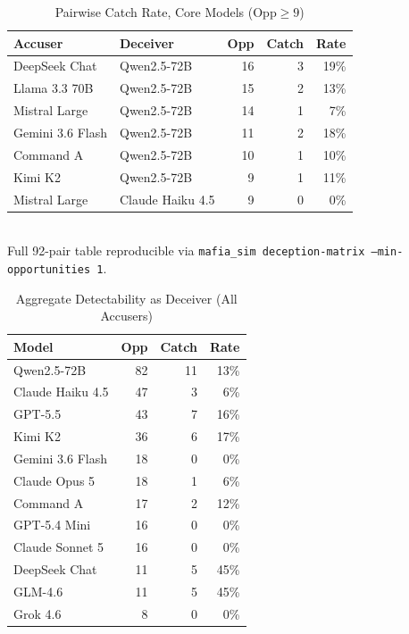 \documentclass[10pt,conference]{IEEEtran}
\begin{document}
\begin{table}[t]
\centering
\caption{Pairwise Catch Rate, Core Models ($\mathrm{Opp} \geq 9$)}
\label{tab:pairwise}
\begin{tabular}{@{}llrrr@{}}
\toprule
Accuser & Deceiver & Opp & Catch & Rate \\
\midrule
DeepSeek Chat     & Qwen2.5-72B     & 16 & 3 & 19\% \\
Llama 3.3 70B     & Qwen2.5-72B     & 15 & 2 & 13\% \\
Mistral Large     & Qwen2.5-72B     & 14 & 1 & 7\%  \\
Gemini 3.6 Flash  & Qwen2.5-72B     & 11 & 2 & 18\% \\
Command A         & Qwen2.5-72B     & 10 & 1 & 10\% \\
Kimi K2           & Qwen2.5-72B     & 9  & 1 & 11\% \\
Mistral Large     & Claude Haiku 4.5 & 9  & 0 & 0\%  \\
\bottomrule
\end{tabular}
\\[0.3em]
\footnotesize Full 92-pair table reproducible via \texttt{mafia\_sim deception-matrix --min-opportunities 1}.
\end{table}

\begin{table}[t]
\centering
\caption{Aggregate Detectability as Deceiver (All Accusers)}
\label{tab:aggregate}
\begin{tabular}{@{}lrrr@{}}
\toprule
Model & Opp & Catch & Rate \\
\midrule
Qwen2.5-72B      & 82 & 11 & 13\% \\
Claude Haiku 4.5 & 47 & 3  & 6\%  \\
GPT-5.5          & 43 & 7  & 16\% \\
Kimi K2          & 36 & 6  & 17\% \\
Gemini 3.6 Flash & 18 & 0  & 0\%  \\
Claude Opus 5    & 18 & 1  & 6\%  \\
Command A        & 17 & 2  & 12\% \\
GPT-5.4 Mini     & 16 & 0  & 0\%  \\
Claude Sonnet 5  & 16 & 0  & 0\%  \\
DeepSeek Chat    & 11 & 5  & 45\% \\
GLM-4.6          & 11 & 5  & 45\% \\
Grok 4.6         & 8  & 0  & 0\%  \\
\bottomrule
\end{tabular}
\end{table}
\end{document}
